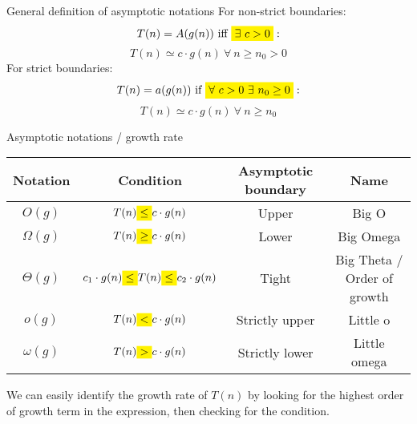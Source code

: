 \documentclass{article}
\begin{document}



\newpage
\tableofcontents
\newpage


\begin{definition}
    {General definition of asymptotic notations}
    For non-strict boundaries:
    \[T(n) = A(g(n))\ \text{iff}\ \mathcolorbox{yellow}{\exists\ c > 0}:\]
    \[T(n) \simeq c\cdot g(n)\ \forall\ n \geq n_0 > 0\]
    For strict boundaries:
    \[T(n) = a(g(n))\ \text{if}\ \mathcolorbox{yellow}{\forall\ c > 0\ \exists\ n_0 \geq 0}:\]
    \[T(n) \simeq c\cdot g(n)\ \forall\ n \geq n_0\]
\end{definition}

\begin{definition}
    {Asymptotic notations / growth rate}
    \begin{tabular}{|c|c|c|c|}
        \hline
        \textbf{Notation} & \textbf{Condition}                                                                         & \textbf{Asymptotic boundary} & \textbf{Name}               \\ \hline
        $O(g)$            & $T(n) \mathcolorbox{yellow}{\leq} c\cdot g(n)$                                             & Upper                        & Big O                       \\
        $\Omega(g)$       & $T(n) \mathcolorbox{yellow}{\geq} c\cdot g(n)$                                             & Lower                        & Big Omega                   \\
        $\Theta(g)$       & $ c_1\cdot g(n)\mathcolorbox{yellow}{\leq} T(n) \mathcolorbox{yellow}{\leq} c_2\cdot g(n)$ & Tight                        & Big Theta / Order of growth \\
        $o(g)$            & $T(n) \mathcolorbox{yellow}{<} c\cdot g(n)$                                                & Strictly upper               & Little o                    \\
        $\omega(g)$       & $T(n) \mathcolorbox{yellow}{>} c\cdot g(n)$                                                & Strictly lower               & Little omega                \\ \hline
    \end{tabular}
    We can easily identify the growth rate of $T(n)$ by looking for the highest order of growth term in the expression, then checking for the condition.
\end{definition}
\end{document}
